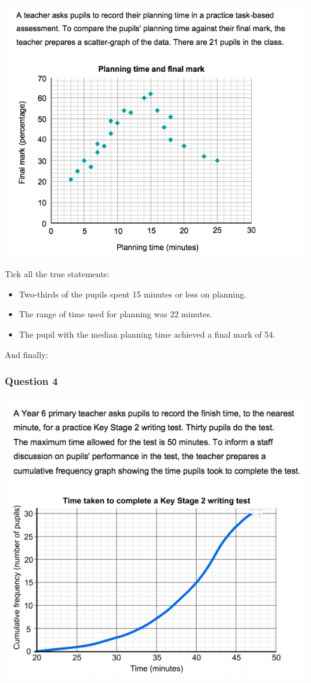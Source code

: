 \documentclass[]{book}
\providecommand{\tightlist}{%
  \setlength{\itemsep}{0pt}\setlength{\parskip}{0pt}}
\theoremstyle{definition}
\theoremstyle{definition}
\theoremstyle{definition}
\theoremstyle{remark}
\begin{document}
\includegraphics{imgs/numtest_3.png}

Tick all the true statements:

\begin{itemize}
\tightlist
\item
  Two-thirds of the pupils spent 15 minutes or less on planning.
\item
  The range of time used for planning was 22 minutes.
\item
  The pupil with the median planning time achieved a final mark of 54.
\end{itemize}

And finally:

\hypertarget{question-4}{%
\subsubsection*{Question 4}\label{question-4}}

\includegraphics{imgs/numtest_4.png}
\end{document}
